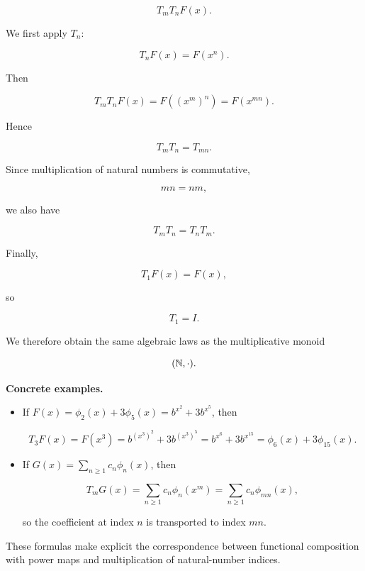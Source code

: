 \[
T_mT_nF(x).
\]

We first apply \(T_n\):

\[
T_nF(x)=F(x^n).
\]

Then

\[
T_mT_nF(x)
=
F((x^m)^n)
=
F(x^{mn}).
\]

Hence

\[
\boxed{
T_mT_n=T_{mn}.
}
\]

Since multiplication of natural numbers is commutative,

\[
mn=nm,
\]

we also have

\[
\boxed{
T_mT_n=T_nT_m.
}
\]

Finally,

\[
T_1F(x)=F(x),
\]

so

\[
\boxed{
T_1=I.
}
\]

We therefore obtain the same algebraic laws as the multiplicative
monoid

\[
(\mathbb{N},\cdot).
\]



\noindent\textbf{Concrete examples.}
\begin{itemize}
  \item If \(F(x)=\phi_2(x)+3\phi_5(x)=b^{x^2}+3b^{x^5}\), then
  

\[
  T_3F(x)=F(x^3)=b^{(x^3)^2}+3b^{(x^3)^5}=b^{x^6}+3b^{x^{15}}=\phi_6(x)+3\phi_{15}(x).
  \]


  \item If \(G(x)=\sum_{n\ge1} c_n\phi_n(x)\), then
  

\[
  T_mG(x)=\sum_{n\ge1} c_n\phi_n(x^m)=\sum_{n\ge1} c_n\phi_{mn}(x),
  \]


  so the coefficient at index \(n\) is transported to index \(mn\).
\end{itemize}

\medskip

\noindent These formulas make explicit the correspondence between functional composition with power maps and multiplication of natural-number indices.

